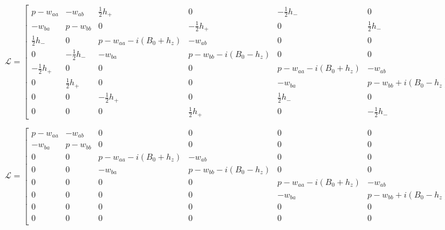 \clearpage
\begin{landscape}
\begin{equation}\label{eq:60}
\mathcal{L} = \begin{bmatrix}
       p-w_{aa} & -w_{ab} & \frac{1}{2}h_+ & 0 & -\frac{1}{2}h_- & 0 & 0 & 0  \\[0.3em]
       -w_{ba} & p-w_{bb} & 0 & -\frac{1}{2}h_+ & 0 & \frac{1}{2}h_- & 0 & 0  \\[0.3em]
       \frac{1}{2}h_- & 0 & p-w_{aa}-i(B_0+h_z) & -w_{ab} & 0 & 0 & -\frac{1}{2}h_- & 0  \\[0.3em]
       0 & -\frac{1}{2}h_- & -w_{ba} & p-w_{bb}-i(B_0-h_z) & 0 & 0 & 0 & \frac{1}{2}h_-  \\[0.3em]
       -\frac{1}{2}h_+ & 0 & 0 & 0 & p-w_{aa}-i(B_0+h_z) & -w_{ab} & \frac{1}{2}h_+ & 0  \\[0.3em]
       0 & \frac{1}{2}h_+ & 0 & 0 & -w_{ba} & p-w_{bb}+i(B_0-h_z) & 0 & -\frac{1}{2}h_+  \\[0.3em]
       0 & 0 & -\frac{1}{2}h_+ & 0 & \frac{1}{2}h_- & 0 & p-w_{aa} & -w_{ab}  \\[0.3em]
       0 & 0 & 0 & \frac{1}{2}h_+ & 0 & -\frac{1}{2}h_- & -w_{ba} & p-w_{bb} 
     \end{bmatrix}
\end{equation}
\end{landscape} 

\begin{landscape}
\begin{equation}\label{eq:61}
\mathcal{L} = \begin{bmatrix}
       p-w_{aa} & -w_{ab} & 0 & 0 & 0 & 0 & 0 & 0  \\[0.3em]
       -w_{ba} & p-w_{bb} & 0 & 0 & 0 & 0 & 0 & 0  \\[0.3em]
       0 & 0 & p-w_{aa}-i(B_0+h_z) & -w_{ab} & 0 & 0 & 0 & 0  \\[0.3em]
       0 & 0 & -w_{ba} & p-w_{bb}-i(B_0-h_z) & 0 & 0 & 0 & 0  \\[0.3em]
       0 & 0 & 0 & 0 & p-w_{aa}-i(B_0+h_z) & -w_{ab} & 0 & 0  \\[0.3em]
       0 & 0 & 0 & 0 & -w_{ba} & p-w_{bb}+i(B_0-h_z) & 0 & 0  \\[0.3em]
       0 & 0 & 0 & 0 & 0 & 0 & p-w_{aa} & -w_{ab}  \\[0.3em]
       0 & 0 & 0 & 0 & 0 & 0 & -w_{ba} & p-w_{bb} 
     \end{bmatrix}
\end{equation}
\end{landscape} 

